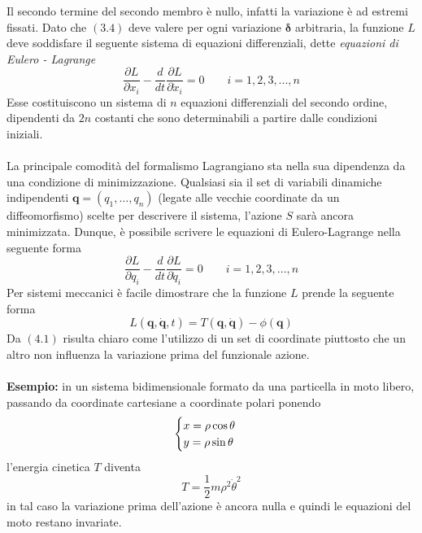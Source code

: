 \documentclass{article}
\begin{document}
Il secondo termine del secondo membro è nullo, infatti la variazione è ad estremi fissati. Dato che $(3.4)$ deve valere per ogni variazione $\boldsymbol{\delta}$ arbitraria, la funzione $L$ deve soddisfare il seguente sistema di equazioni differenziali, dette \textit{equazioni di Eulero - Lagrange}
\begin{equation}
    \frac{\partial L}{\partial x_i} - \frac{d}{dt}\frac{\partial L}{\partial \dot{x}_i} = 0 \qquad i = 1, 2, 3, ... , n \tag{3.5}
\end{equation}
Esse costituiscono un sistema di $n$ equazioni differenziali del secondo ordine, dipendenti da $2n$ costanti che sono determinabili a partire dalle condizioni iniziali. \\ \\
La principale comodità del formalismo Lagrangiano sta nella sua dipendenza da una condizione di minimizzazione. Qualsiasi sia il set di variabili dinamiche indipendenti $\mathbf{q} = (q_1, \dots, q_n)$ (legate alle vecchie coordinate da un diffeomorfismo) scelte per descrivere il sistema, l'azione $S$ sarà ancora minimizzata. Dunque, è possibile scrivere le equazioni di Eulero-Lagrange nella seguente forma
\begin{equation}
    \frac{\partial L}{\partial q_i} - \frac{d}{dt}\frac{\partial L}{\partial \dot{q}_i} = 0 \qquad i = 1, 2, 3, ... , n \tag{3.6}
\end{equation}
Per sistemi meccanici è facile dimostrare che la funzione $L$ prende la seguente forma
\begin{equation}
    L(\mathbf{q}, \dot{\mathbf{q}}, t) = T(\mathbf{q}, \dot{\mathbf{q}}) - \phi(\mathbf{q}) \tag{3.7}
\end{equation}
Da $(4.1)$ risulta chiaro come l'utilizzo di un set di coordinate piuttosto che un altro non influenza la variazione prima del funzionale azione. \\ \\
\textbf{Esempio:} in un sistema bidimensionale formato da una particella in moto libero, passando da coordinate cartesiane a coordinate polari ponendo
\begin{equation}
    \begin{cases}
        x = \rho \cos \theta \\
        y = \rho \sin \theta
    \end{cases} \notag
\end{equation}
l'energia cinetica $T$ diventa
\begin{equation}
    T = \frac{1}{2}m\rho^2 \dot{\theta}^2 \tag{3.8}
\end{equation}
in tal caso la variazione prima dell'azione è ancora nulla e quindi le equazioni del moto restano invariate.
\end{document}
